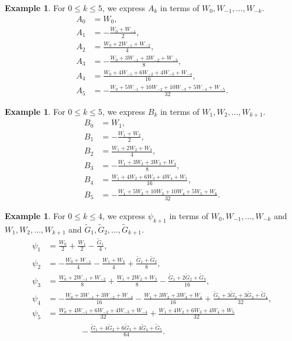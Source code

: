 \documentclass[11pt]{article}%
\theoremstyle{definition}
\newtheorem{example}[definition]{Example}
\theoremstyle{plain}
\begin{document}
\begin{example}\label{ex:tm_1st_3rd, Ak}
For $0 \leq k \leq 5$, we express $A_k$  in terms of $W_0, W_{-1}, \ldots, W_{-k}$.
\begin{align*}
	A_0 & = W_0, \\[2pt]
	A_1 & = -\frac{W_0 + W_{-1}}{2}, \\[2pt]
	A_2 & = \frac{W_0 + 2 W_{-1} + W_{-2}}{4}, \\[2pt]
	A_3 & = -\frac{W_0 + 3 W_{-1} + 3 W_{-2} + W_{-3}}{8}, \\[2pt]
	A_4 & = \frac{W_0 + 4 W_{-1} + 6 W_{-2} + 4 W_{-3} + W_{-4}}{16}, \\[2pt]
	A_5 & = -\frac{W_0 + 5 W_{-1} + 10 W_{-2} + 10 W_{-3} + 5 W_{-4} + W_{-5}}{32}.
\end{align*}
\end{example}

\begin{example}\label{ex:tm_1st_3rd, Bk}
For $0 \leq k \leq 5$, we express $B_k$ in terms of $W_1, W_2, \ldots, W_{k+1}$.
\begin{align*}
	B_0 & = W_1, \\[2pt]
	B_1 & = -\frac{W_1 + W_2}{2}, \\[2pt]
	B_2 & = \frac{W_1 + 2 W_{2} + W_{3}}{4}, \\[2pt]
	B_3 & = -\frac{W_1 + 3 W_{2} + 3 W_{3} + W_{4}}{8}, \\[2pt]
	B_4 & = \frac{W_1 + 4 W_{2} + 6 W_{3} + 4 W_{4} + W_{5}}{16}, \\[2pt]
	B_5 & = -\frac{W_1 + 5 W_{2} + 10 W_{3} + 10 W_{4} + 5 W_{5} + W_{6}}{32}.
\end{align*}
\end{example}

\begin{example}\label{ex:tm_1st_3rd, psik}
For $0 \leq k \leq 4$, we express $\psi_{k+1}$ in terms of $W_0, W_{-1}, \ldots, W_{-k}$ and $W_1, W_2, \ldots, W_{k+1}$ and $\tilde G_1, \tilde G_2, \ldots, \tilde G_{k+1}$.
\begin{align*}
	\psi_1 & = \frac{W_0}{2} + \frac{W_1}{2} - \frac{\tilde G_1}{4}, \\[2pt]
	\psi_2 & = -\frac{W_0 + W_{-1}}{4} - \frac{W_1 + W_2}{4} + \frac{\tilde G_1 + \tilde G_2}{8}, \\[2pt]
	\psi_3 & = \frac{W_0 + 2W_{-1} + W_{-2}}{8} + \frac{W_1 + 2W_2 + W_3}{8} - \frac{\tilde G_1 + 2\tilde G_2 + \tilde G_3}{16}, \\[2pt]
	\psi_4 & = -\frac{W_0 + 3W_{-1} + 3W_{-2} + W_{-3}}{16} - \frac{W_1 + 3W_2 + 3W_3 + W_4}{16} + \frac{\tilde G_1 + 3\tilde G_2 + 3\tilde G_3 + \tilde G_4}{32}, \\[2pt]
	\psi_5 & = \frac{W_0 + 4W_{-1} + 6W_{-2} + 4W_{-3} + W_{-4}}{32} 
	+ \frac{W_1 + 4W_2 + 6W_3 + 4W_4 + W_5}{32} \\
	& \qquad \qquad - \frac{\tilde G_1 + 4\tilde G_2 + 6\tilde G_3 + 4\tilde G_4 + \tilde G_5}{64}.
\end{align*}
\end{example}
\end{document}
